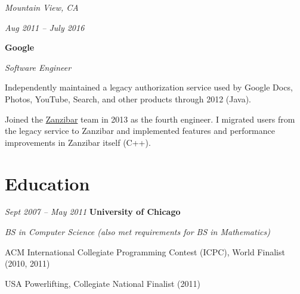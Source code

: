 \documentclass[10pt, letterpaper]{article}
\begin{document}
\vspace{0.2 cm}

\begin{twocolentry}{
    \textit{Mountain View, CA}

    \textit{Aug 2011 – July 2016}
}
    \textbf{Google}

    \textit{Software Engineer}
\end{twocolentry}

\vspace{0.1 cm}
\begin{onecolentry}
    \begin{highlights}
        \item Independently maintained a legacy authorization service used by Google Docs, Photos, YouTube, Search, and other products through 2012 (Java).
        \item Joined the \href{https://research.google/pubs/zanzibar-googles-consistent-global-authorization-system/}{Zanzibar} team in 2013 as the fourth engineer. I migrated users from the legacy service to Zanzibar and implemented features and performance improvements in Zanzibar itself (C++).
    \end{highlights}
\end{onecolentry}

\section{Education}

\begin{twocolentry}{
    \textit{Sept 2007 – May 2011}
}
    \textbf{University of Chicago}
\end{twocolentry}

\begin{onecolentry}
    \textit{BS in Computer Science (also met requirements for BS in Mathematics)}
\end{onecolentry}

\vspace{0.1 cm}
\begin{onecolentry}
    \begin{highlights}
        \item ACM International Collegiate Programming Contest (ICPC), World Finalist (2010, 2011)
        \item USA Powerlifting, Collegiate National Finalist (2011)
    \end{highlights}
\end{onecolentry}
\end{document}
